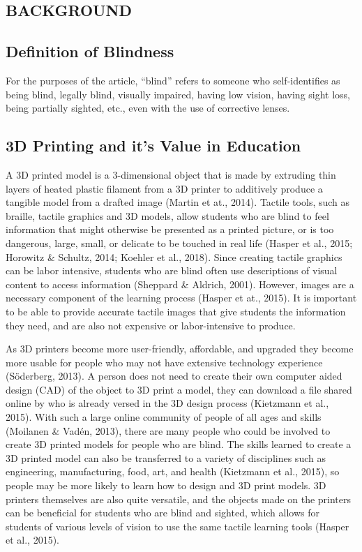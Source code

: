 \documentclass[11.5pt]{sig-alternate} %
\begin{document}
\begin{large}
\section*{BACKGROUND}

\subsection*{Definition of Blindness}

For the purposes of the article, “blind” refers to someone who self-identifies as being blind, legally blind, visually impaired, having low vision, having sight loss, being partially sighted, etc., even with the use of corrective lenses.

\subsection*{3D Printing and it's Value in Education}

A 3D printed model is a 3-dimensional object that is made by extruding thin layers of heated plastic filament from a 3D printer to additively produce a tangible model from a drafted image (Martin et at., 2014). Tactile tools, such as braille, tactile graphics and 3D models, allow students who are blind to feel information that might otherwise be presented as a printed picture, or is too dangerous, large, small, or delicate to be touched in real life (Hasper et al., 2015; Horowitz \& Schultz, 2014; Koehler et al., 2018). Since creating tactile graphics can be labor intensive, students who are blind often use descriptions of visual content to access information (Sheppard \& Aldrich, 2001). However, images are a necessary component of the learning process (Hasper et at., 2015). It is important to be able to provide accurate tactile images that give students the information they need, and are also not expensive or labor-intensive to produce.

As 3D printers become more user-friendly, affordable, and upgraded they become more usable for people who may not have extensive technology experience (Söderberg, 2013). A person does not need to create their own computer aided design (CAD) of the object to 3D print a model, they can download a file shared online by who is already versed in the 3D design process (Kietzmann et al., 2015). With such a large online community of people of all ages and skills (Moilanen \& Vadén, 2013), there are many people who could be involved to create 3D printed models for people who are blind. The skills learned to create a 3D printed model can also be transferred to a variety of disciplines such as engineering, manufacturing, food, art, and health (Kietzmann et al., 2015), so people may be more likely to learn how to design and 3D print models. 3D printers themselves are also quite versatile, and the objects made on the printers can be beneficial for students who are blind and sighted, which allows for students of various levels of vision to use the same tactile learning tools (Hasper et al., 2015).


\end{large}
\end{document}
